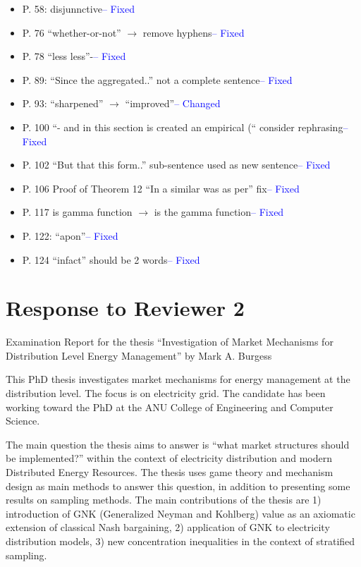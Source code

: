 \documentclass{article}
\begin{document}
\begin{itemize}
\item	P. 58: disjunnctive\textcolor{blue}{-- Fixed}
\item	P. 76 “whether-or-not” $\rightarrow$ remove hyphens\textcolor{blue}{-- Fixed}
\item	P. 78 “less less”-\textcolor{blue}{-- Fixed}
\item	P. 89: “Since the aggregated..” not a complete sentence\textcolor{blue}{-- Fixed}
\item	P. 93: “sharpened” $\rightarrow$ “improved”\textcolor{blue}{-- Changed}
\item	P. 100 “- and in this section is created an empirical (“ consider rephrasing\textcolor{blue}{-- Fixed}
\item	P. 102 “But that this form..” sub-sentence used as new sentence\textcolor{blue}{-- Fixed}
\item	P. 106 Proof of Theorem 12 “In a similar was as per” fix\textcolor{blue}{-- Fixed}
\item	P. 117 is gamma function $\rightarrow$ is the gamma function\textcolor{blue}{-- Fixed}
\item	P. 122: “apon”\textcolor{blue}{-- Fixed}
\item	P. 124 “infact” should be 2 words\textcolor{blue}{-- Fixed}
\end{itemize}



\section{Response to Reviewer 2}

Examination Report for the thesis “Investigation of Market Mechanisms for Distribution Level Energy Management” by Mark A. Burgess

This PhD thesis investigates market mechanisms for energy management at the distribution
level. The focus is on electricity grid. The candidate has been working toward the PhD at the
ANU College of Engineering and Computer Science.

The main question the thesis aims to answer is “what market structures should be
implemented?” within the context of electricity distribution and modern Distributed Energy
Resources. The thesis uses game theory and mechanism design as main methods to answer
this question, in addition to presenting some results on sampling methods. The main
contributions of the thesis are 1) introduction of GNK (Generalized Neyman and Kohlberg)
value as an axiomatic extension of classical Nash bargaining, 2) application of GNK to
electricity distribution models, 3) new concentration inequalities in the context of stratified
sampling.
\end{document}
